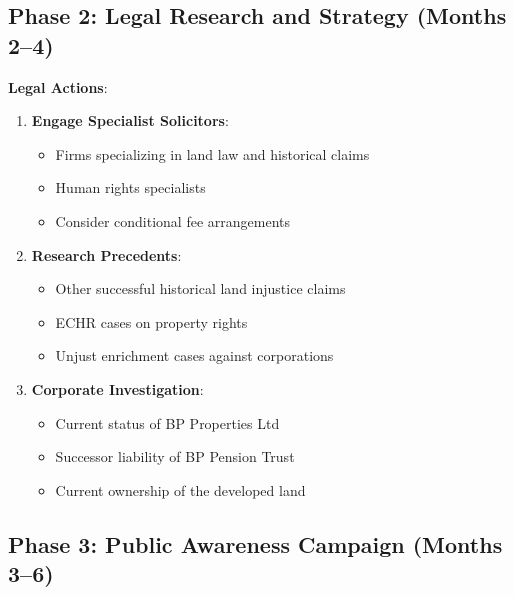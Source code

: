 \documentclass[11pt,a4paper]{article}
\begin{document}
\subsection{Phase 2: Legal Research and Strategy (Months 2--4)}

\begin{action}
\textbf{Legal Actions}:
\begin{enumerate}[label=\arabic*.]
    \item \textbf{Engage Specialist Solicitors}:
    \begin{itemize}
        \item Firms specializing in land law and historical claims
        \item Human rights specialists
        \item Consider conditional fee arrangements
    \end{itemize}
    
    \item \textbf{Research Precedents}:
    \begin{itemize}
        \item Other successful historical land injustice claims
        \item ECHR cases on property rights
        \item Unjust enrichment cases against corporations
    \end{itemize}
    
    \item \textbf{Corporate Investigation}:
    \begin{itemize}
        \item Current status of BP Properties Ltd
        \item Successor liability of BP Pension Trust
        \item Current ownership of the developed land
    \end{itemize}
\end{enumerate}
\end{action}

\subsection{Phase 3: Public Awareness Campaign (Months 3--6)}
\end{document}
